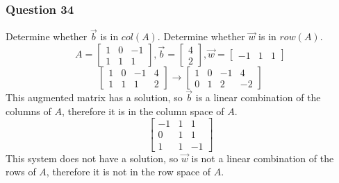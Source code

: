 \documentclass{math}
\begin{document}
\subsubsection*{Question 34}
Determine whether \( \vec{b} \) is in \( col(A) \). Determine whether
\( \vec{w} \) is in \( row(A) \).
\[ A = \begin{bmatrix}
  1 & 0 & -1 \\
  1 & 1 & 1
\end{bmatrix}, \vec{b} = \begin{bmatrix}
  4 \\ 2
\end{bmatrix}, \vec{w} = \begin{bmatrix}-1 & 1 & 1\end{bmatrix} \]
\[ \begin{bmatrix}
  1 & 0 & -1 & 4 \\
  1 & 1 & 1 & 2
\end{bmatrix} \to \begin{bmatrix}
  1 & 0 & -1 & 4 \\
  0 & 1 & 2 & -2
\end{bmatrix} \]
This augmented matrix has a solution, so \( \vec{b} \) is a linear combination
of the columns of \( A \), therefore it is in the column space of \( A \).
\[ \begin{bmatrix}
  -1 & 1 & 1 \\
  0 & 1 & 1 \\
  1 & 1 & -1
\end{bmatrix} \]
This system does not have a solution, so \( \vec{w} \) is not a linear
combination of the rows of \( A \), therefore it is not in the row space of
\( A \).
\end{document}
